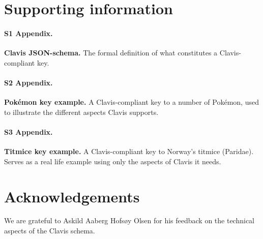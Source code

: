 \documentclass[10pt,letterpaper]{article}
\begin{document}
\section*{
Supporting information
}

\paragraph*{S1 Appendix.}
\label{S1_Appendix}
{\bf Clavis JSON-schema.} The formal definition of what constitutes a Clavis-compliant key.

\paragraph*{S2 Appendix.}
\label{S2_Appendix}
{\bf Pokémon key example.} A Clavis-compliant key to a number of Pokémon, used to illustrate the different aspects Clavis supports.

\paragraph*{S3 Appendix.}
\label{S3_Appendix}
{\bf Titmice key example.} A Clavis-compliant key to Norway's titmice (Paridae). Serves as a real life example using only the aspects of Clavis it needs.

\section*{
Acknowledgements
}
We are grateful to Askild Aaberg Hofsøy Olsen for his feedback on the technical aspects of the Clavis schema. 
\nolinenumbers

\end{document}
